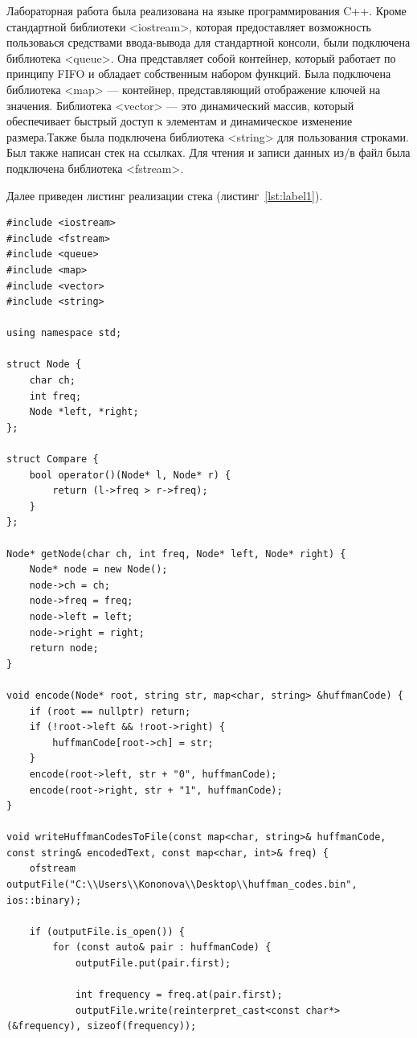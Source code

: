 \documentclass[12pt, a4paper]{article}
\begin{document}
Лабораторная работа была реализована на языке программирования C++. Кроме стандартной библиотеки <iostream>, которая предоставляет возможность пользоваься средствами ввода-вывода для стандартной консоли, были подключена библиотека <queue>. Она представляет собой контейнер, который работает по принципу FIFO и обладает собственным набором функций. Была подключена библиотека <map> --- контейнер, представляющий отображение ключей на значения. Библиотека <vector> --- это  динамический массив, который обеспечивает быстрый доступ к элементам и динамическое изменение размера.Также была подключена библиотека <string> для пользования строками. Был также написан стек на ссылках. Для чтения и записи данных из/в файл была подключена библиотека <fstream>.

Далее приведен листинг реализации стека (листинг~\ref{lst:label1}).
\begin{lstlisting}[caption={Исходный код программы для сжатия по Хаффману},label={lst:label1}]
#include <iostream>
#include <fstream>
#include <queue>
#include <map>
#include <vector>
#include <string>

using namespace std;

struct Node {
	char ch;
	int freq;
	Node *left, *right;
};

struct Compare {
	bool operator()(Node* l, Node* r) {
		return (l->freq > r->freq);
	}
};

Node* getNode(char ch, int freq, Node* left, Node* right) {
	Node* node = new Node();
	node->ch = ch;
	node->freq = freq;
	node->left = left;
	node->right = right;
	return node;
}

void encode(Node* root, string str, map<char, string> &huffmanCode) {
	if (root == nullptr) return;
	if (!root->left && !root->right) {
		huffmanCode[root->ch] = str;
	}
	encode(root->left, str + "0", huffmanCode);
	encode(root->right, str + "1", huffmanCode);
}

void writeHuffmanCodesToFile(const map<char, string>& huffmanCode, const string& encodedText, const map<char, int>& freq) {
	ofstream outputFile("C:\\Users\\Kononova\\Desktop\\huffman_codes.bin", ios::binary);

	if (outputFile.is_open()) {
		for (const auto& pair : huffmanCode) {
			outputFile.put(pair.first);

			int frequency = freq.at(pair.first);
			outputFile.write(reinterpret_cast<const char*>(&frequency), sizeof(frequency));


\end{lstlisting}
\end{document}
